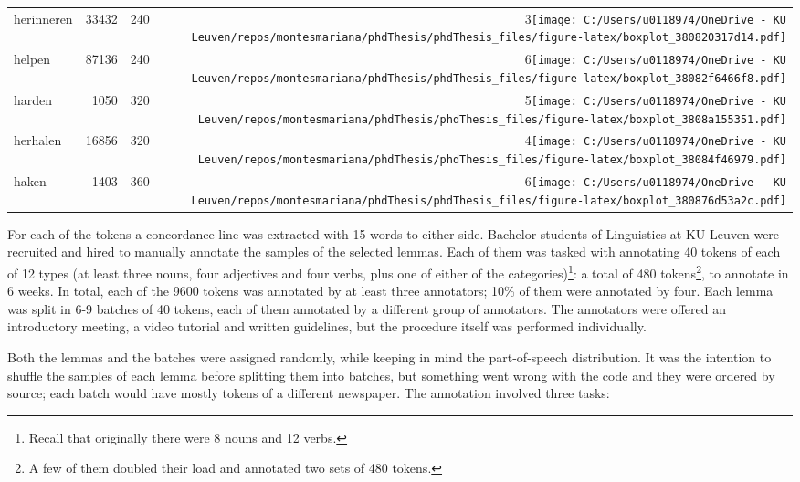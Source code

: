 \documentclass[
]{book}
\begin{document}
\begin{longtable}[t]{lrr>{}r}
\hspace{1em}herinneren & 33432 & 240 & 3\texttt{[image: C:/Users/u0118974/OneDrive - KU Leuven/repos/montesmariana/phdThesis/phdThesis\_files/figure-latex/boxplot\_380820317d14.pdf]}\\
\hspace{1em}helpen & 87136 & 240 & 6\texttt{[image: C:/Users/u0118974/OneDrive - KU Leuven/repos/montesmariana/phdThesis/phdThesis\_files/figure-latex/boxplot\_38082f6466f8.pdf]}\\
\hspace{1em}harden & 1050 & 320 & 5\texttt{[image: C:/Users/u0118974/OneDrive - KU Leuven/repos/montesmariana/phdThesis/phdThesis\_files/figure-latex/boxplot\_3808a155351.pdf]}\\
\hspace{1em}herhalen & 16856 & 320 & 4\texttt{[image: C:/Users/u0118974/OneDrive - KU Leuven/repos/montesmariana/phdThesis/phdThesis\_files/figure-latex/boxplot\_38084f46979.pdf]}\\
\hspace{1em}haken & 1403 & 360 & 6\texttt{[image: C:/Users/u0118974/OneDrive - KU Leuven/repos/montesmariana/phdThesis/phdThesis\_files/figure-latex/boxplot\_380876d53a2c.pdf]}\\*
\end{longtable}

For each of the tokens a concordance line was extracted with 15 words to either side. Bachelor students of Linguistics at KU Leuven were recruited and hired to manually annotate the samples of the selected lemmas. Each of them was tasked with annotating 40 tokens of each of 12 types (at least three nouns, four adjectives and four verbs, plus one of either of the categories)\footnote{Recall that originally there were 8 nouns and 12 verbs.}: a total of 480 tokens\footnote{A few of them doubled their load and annotated two sets of 480 tokens.}, to annotate in 6 weeks. In total, each of the 9600 tokens was annotated by at least three annotators; 10\% of them were annotated by four. Each lemma was split in 6-9 batches of 40 tokens, each of them annotated by a different group of annotators. The annotators were offered an introductory meeting, a video tutorial and written guidelines, but the procedure itself was performed individually.

Both the lemmas and the batches were assigned randomly, while keeping in mind the part-of-speech distribution. It was the intention to shuffle the samples of each lemma before splitting them into batches, but something went wrong with the code and they were ordered by source; each batch would have mostly tokens of a different newspaper.
The annotation involved three tasks:
\end{document}
